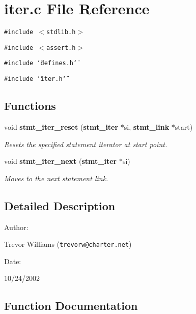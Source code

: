 \section{iter.c File Reference}
\label{iter_8c}
{\tt \#include $<$stdlib.h$>$}\par
{\tt \#include $<$assert.h$>$}\par
{\tt \#include \char`\"{}defines.h\char`\"{}}\par
{\tt \#include \char`\"{}iter.h\char`\"{}}\par
\subsection*{Functions}
\begin{CompactItemize}
\item 
void {\bf stmt\_\-iter\_\-reset} ({\bf stmt\_\-iter} $\ast$si, {\bf stmt\_\-link} $\ast$start)
\begin{CompactList}\small\item\em Resets the specified statement iterator at start point.\item\end{CompactList}\item 
void {\bf stmt\_\-iter\_\-next} ({\bf stmt\_\-iter} $\ast$si)
\begin{CompactList}\small\item\em Moves to the next statement link.\item\end{CompactList}\end{CompactItemize}


\subsection{Detailed Description}


\begin{Desc}
\item[Author: ]\par
Trevor Williams ({\tt trevorw@charter.net}) \end{Desc}
\begin{Desc}
\item[Date: ]\par
10/24/2002\end{Desc}


\subsection{Function Documentation}

